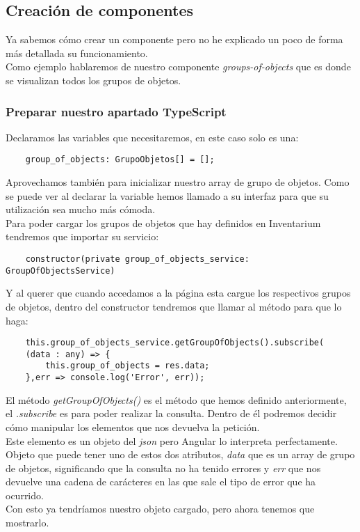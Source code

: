 \subsection{Creación de componentes}
Ya sabemos cómo crear un componente pero no he explicado un poco de forma más detallada su funcionamiento.
\\Como ejemplo hablaremos de nuestro componente \textit{groups-of-objects} que es donde se visualizan todos los grupos de objetos.

\subsubsection{Preparar nuestro apartado TypeScript}
Declaramos las variables que necesitaremos, en este caso solo es una:
\begin{verbatim}
    group_of_objects: GrupoObjetos[] = [];
\end{verbatim}
Aprovechamos también para inicializar nuestro array de grupo de objetos. Como se puede ver al declarar la variable hemos llamado a su interfaz para que su utilización sea mucho más cómoda.
\\Para poder cargar los grupos de objetos que hay definidos en Inventarium tendremos que importar su servicio:
\begin{verbatim}
    constructor(private group_of_objects_service: GroupOfObjectsService)
\end{verbatim}
Y al querer que cuando accedamos a la página esta cargue los respectivos grupos de objetos, dentro del constructor tendremos que llamar al método para que lo haga:
\begin{verbatim}
    this.group_of_objects_service.getGroupOfObjects().subscribe(
    (data : any) => { 
        this.group_of_objects = res.data;
    },err => console.log('Error', err));
\end{verbatim}
El método \textit{getGroupOfObjects()} es el método que hemos definido anteriormente, el \textit{.subscribe} es para poder realizar la consulta. Dentro de él podremos decidir cómo manipular los elementos que nos devuelva la petición.
\\Este elemento es un objeto del \textit{json} pero Angular lo interpreta perfectamente. Objeto que puede tener uno de estos dos atributos, \textit{data} que es un array de grupo de objetos, significando que la consulta no ha tenido errores y \textit{err} que nos devuelve una cadena de carácteres en las que sale el tipo de error que ha ocurrido.
\\Con esto ya tendríamos nuestro objeto cargado, pero ahora tenemos que mostrarlo.
